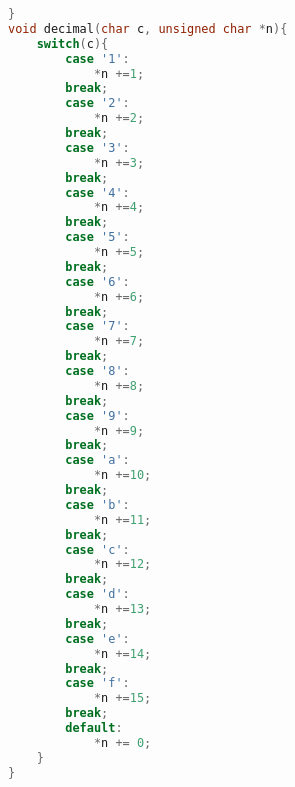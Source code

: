 \begin{lstlisting}[language={C}, caption={Analizador de tramas en C}, label={Script}]
}
void decimal(char c, unsigned char *n){
	switch(c){
		case '1':
			*n +=1;
		break;
		case '2':
			*n +=2;
		break;
		case '3':
			*n +=3;
		break;
		case '4':
			*n +=4;
		break;
		case '5':
			*n +=5;
		break;
		case '6':
			*n +=6;
		break;
		case '7':
			*n +=7;
		break;
		case '8':
			*n +=8;
		break;
		case '9':
			*n +=9;
		break;
		case 'a':
			*n +=10;
		break;
		case 'b':
			*n +=11;
		break;
		case 'c':
			*n +=12;
		break;
		case 'd':
			*n +=13;
		break;
		case 'e':
			*n +=14;
		break;
		case 'f':
			*n +=15;
		break;
		default:
			*n += 0;
	}
}

	\end{lstlisting}